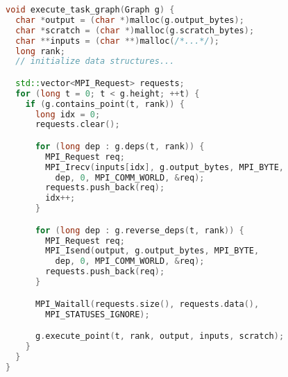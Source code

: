 \begin{lstlisting}[language=C++,caption={Excerpt from Task Bench implementation in MPI.},label={lst:code-sample},style=codeblocktop,float]
void execute_task_graph(Graph g) {
  char *output = (char *)malloc(g.output_bytes);
  char *scratch = (char *)malloc(g.scratch_bytes);
  char **inputs = (char **)malloc(/*...*/);
  long rank;
  // initialize data structures...

  std::vector<MPI_Request> requests;
  for (long t = 0; t < g.height; ++t) {
    if (g.contains_point(t, rank)) {
      long idx = 0;
      requests.clear();

      for (long dep : g.deps(t, rank)) {
        MPI_Request req;
        MPI_Irecv(inputs[idx], g.output_bytes, MPI_BYTE,
          dep, 0, MPI_COMM_WORLD, &req);
        requests.push_back(req);
        idx++;
      }

      for (long dep : g.reverse_deps(t, rank)) {
        MPI_Request req;
        MPI_Isend(output, g.output_bytes, MPI_BYTE,
          dep, 0, MPI_COMM_WORLD, &req);
        requests.push_back(req);
      }

      MPI_Waitall(requests.size(), requests.data(),
        MPI_STATUSES_IGNORE);

      g.execute_point(t, rank, output, inputs, scratch);
    }
  }
}
\end{lstlisting}
